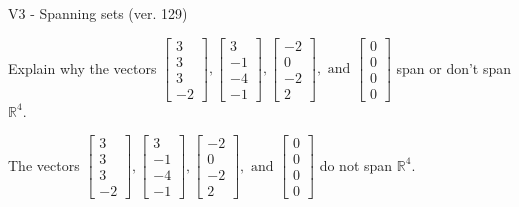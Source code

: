 \begin{exercise}
  \begin{exerciseTitle}V3 - Spanning sets (ver. 129)\end{exerciseTitle}
  \begin{exerciseStatement}
    Explain why the vectors \(\left[\begin{array}{r}
3 \\
3 \\
3 \\
-2
\end{array}\right] , \left[\begin{array}{r}
3 \\
-1 \\
-4 \\
-1
\end{array}\right] , \left[\begin{array}{r}
-2 \\
0 \\
-2 \\
2
\end{array}\right] , \text{ and } \left[\begin{array}{r}
0 \\
0 \\
0 \\
0
\end{array}\right]\) span or don't span \(\mathbb{R}^4\). 
	


  \end{exerciseStatement}
  \begin{exerciseAnswer}
   The vectors \(\left[\begin{array}{r}
3 \\
3 \\
3 \\
-2
\end{array}\right] , \left[\begin{array}{r}
3 \\
-1 \\
-4 \\
-1
\end{array}\right] , \left[\begin{array}{r}
-2 \\
0 \\
-2 \\
2
\end{array}\right] , \text{ and } \left[\begin{array}{r}
0 \\
0 \\
0 \\
0
\end{array}\right]\) 
  	 do not  
	span \(\mathbb{R}^4\).
  


  \end{exerciseAnswer}
\end{exercise}